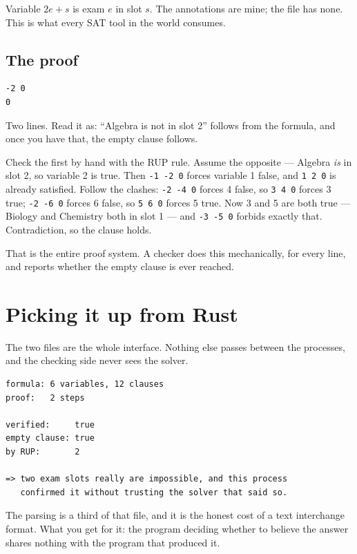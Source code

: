 \documentclass[11pt,a4paper]{article}
\begin{document}
Variable $2e+s$ is exam $e$ in slot $s$. The annotations are mine; the file has
none. This is what every SAT tool in the world consumes.

\subsection*{The proof}

\begin{lstlisting}[style=out]
-2 0
0
\end{lstlisting}

Two lines. Read it as: ``Algebra is not in slot 2'' follows from the formula,
and once you have that, the empty clause follows.

Check the first by hand with the RUP rule. Assume the opposite --- Algebra
\emph{is} in slot 2, so variable 2 is true. Then \texttt{-1 -2 0} forces
variable 1 false, and \texttt{1 2 0} is already satisfied. Follow the clashes:
\texttt{-2 -4 0} forces 4 false, so \texttt{3 4 0} forces 3 true; \texttt{-2 -6
0} forces 6 false, so \texttt{5 6 0} forces 5 true. Now 3 and 5 are both true
--- Biology and Chemistry both in slot 1 --- and \texttt{-3 -5 0} forbids
exactly that. Contradiction, so the clause holds.

That is the entire proof system. A checker does this mechanically, for every
line, and reports whether the empty clause is ever reached.

\section{Picking it up from Rust}

The two files are the whole interface. Nothing else passes between the
processes, and the checking side never sees the solver.



\begin{lstlisting}[style=out]
formula: 6 variables, 12 clauses
proof:   2 steps

verified:     true
empty clause: true
by RUP:       2

=> two exam slots really are impossible, and this process
   confirmed it without trusting the solver that said so.
\end{lstlisting}

The parsing is a third of that file, and it is the honest cost of a text
interchange format. What you get for it: the program deciding whether to
believe the answer shares nothing with the program that produced it.
\end{document}
